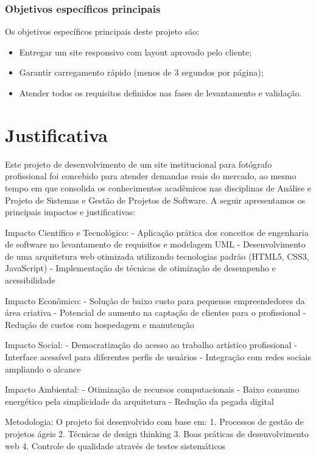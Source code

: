 \subsubsection*{Objetivos específicos principais}
\label{sssec:obj-principais}
Os objetivos específicos principais deste projeto são:

\begin{itemize}
    \item Entregar um site responsivo com layout aprovado pelo cliente;
    \item Garantir carregamento rápido (menos de 3 segundos por página);
    \item Atender todos os requisitos definidos nas fases de levantamento e validação.
\end{itemize}


\section{Justificativa}
\label{sec:justi}

Este projeto de desenvolvimento de um site institucional para fotógrafo profissional foi concebido para atender demandas reais do mercado, ao mesmo tempo em que consolida os conhecimentos acadêmicos nas disciplinas de Análise e Projeto de Sistemas e Gestão de Projetos de Software. A seguir apresentamos os principais impactos e justificativas:

Impacto Científico e Tecnológico:
- Aplicação prática dos conceitos de engenharia de software no levantamento de requisitos e modelagem UML
- Desenvolvimento de uma arquitetura web otimizada utilizando tecnologias padrão (HTML5, CSS3, JavaScript)
- Implementação de técnicas de otimização de desempenho e acessibilidade

Impacto Econômico:
- Solução de baixo custo para pequenos empreendedores da área criativa
- Potencial de aumento na captação de clientes para o profissional
- Redução de custos com hospedagem e manutenção

Impacto Social:
- Democratização do acesso ao trabalho artístico profissional
- Interface acessível para diferentes perfis de usuários
- Integração com redes sociais ampliando o alcance

Impacto Ambiental:
- Otimização de recursos computacionais
- Baixo consumo energético pela simplicidade da arquitetura
- Redução da pegada digital

Metodologia:
O projeto foi desenvolvido com base em:
1. Processos de gestão de projetos ágeis
2. Técnicas de design thinking
3. Boas práticas de desenvolvimento web
4. Controle de qualidade através de testes sistemáticos

